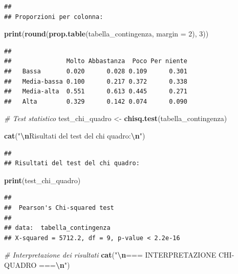 \documentclass[
]{article}
\newenvironment{Shaded}{\begin{snugshade}}{\end{snugshade}}
\newcommand{\AttributeTok}[1]{\textcolor[rgb]{0.13,0.29,0.53}{#1}}
\newcommand{\CommentTok}[1]{\textcolor[rgb]{0.56,0.35,0.01}{\textit{#1}}}
\newcommand{\DecValTok}[1]{\textcolor[rgb]{0.00,0.00,0.81}{#1}}
\newcommand{\FunctionTok}[1]{\textcolor[rgb]{0.13,0.29,0.53}{\textbf{#1}}}
\newcommand{\NormalTok}[1]{#1}
\newcommand{\OtherTok}[1]{\textcolor[rgb]{0.56,0.35,0.01}{#1}}
\newcommand{\SpecialCharTok}[1]{\textcolor[rgb]{0.81,0.36,0.00}{\textbf{#1}}}
\newcommand{\StringTok}[1]{\textcolor[rgb]{0.31,0.60,0.02}{#1}}
\begin{document}
\begin{verbatim}
## 
## Proporzioni per colonna:
\end{verbatim}

\begin{Shaded}
\begin{Highlighting}[]
\FunctionTok{print}\NormalTok{(}\FunctionTok{round}\NormalTok{(}\FunctionTok{prop.table}\NormalTok{(tabella\_contingenza, }\AttributeTok{margin =} \DecValTok{2}\NormalTok{), }\DecValTok{3}\NormalTok{))}
\end{Highlighting}
\end{Shaded}

\begin{verbatim}
##              
##               Molto Abbastanza  Poco Per niente
##   Bassa       0.020      0.028 0.109      0.301
##   Media-bassa 0.100      0.217 0.372      0.338
##   Media-alta  0.551      0.613 0.445      0.271
##   Alta        0.329      0.142 0.074      0.090
\end{verbatim}

\begin{Shaded}
\begin{Highlighting}[]
\CommentTok{\# Test statistico}
\NormalTok{test\_chi\_quadro }\OtherTok{\textless{}{-}} \FunctionTok{chisq.test}\NormalTok{(tabella\_contingenza)}

\FunctionTok{cat}\NormalTok{(}\StringTok{"}\SpecialCharTok{\textbackslash{}n}\StringTok{Risultati del test del chi quadro:}\SpecialCharTok{\textbackslash{}n}\StringTok{"}\NormalTok{)}
\end{Highlighting}
\end{Shaded}

\begin{verbatim}
## 
## Risultati del test del chi quadro:
\end{verbatim}

\begin{Shaded}
\begin{Highlighting}[]
\FunctionTok{print}\NormalTok{(test\_chi\_quadro)}
\end{Highlighting}
\end{Shaded}

\begin{verbatim}
## 
##  Pearson's Chi-squared test
## 
## data:  tabella_contingenza
## X-squared = 5712.2, df = 9, p-value < 2.2e-16
\end{verbatim}

\begin{Shaded}
\begin{Highlighting}[]
\CommentTok{\# Interpretazione dei risultati}
\FunctionTok{cat}\NormalTok{(}\StringTok{"}\SpecialCharTok{\textbackslash{}n}\StringTok{=== INTERPRETAZIONE CHI{-}QUADRO ===}\SpecialCharTok{\textbackslash{}n}\StringTok{"}\NormalTok{)}
\end{Highlighting}
\end{Shaded}
\end{document}
